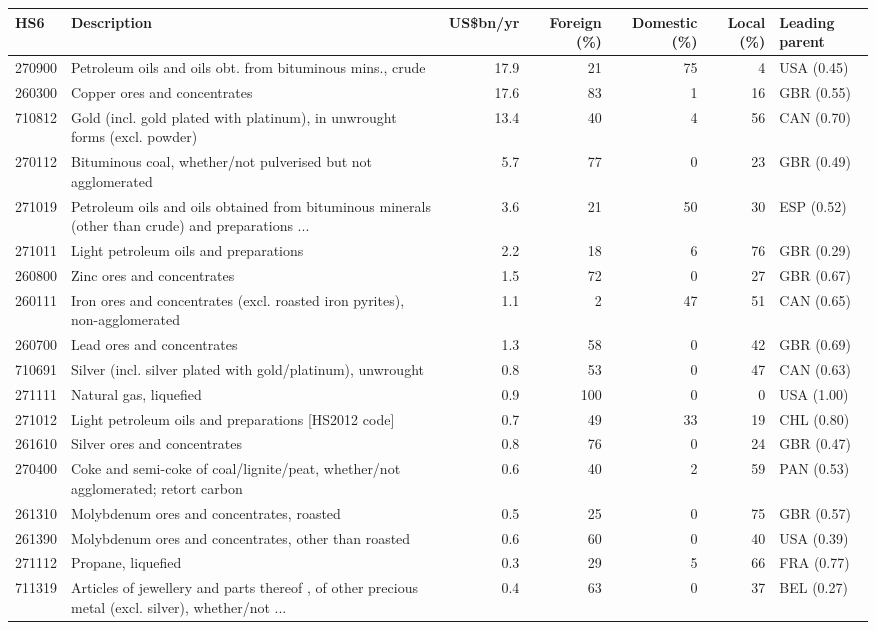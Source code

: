 \begin{tabular}{@{}l p{6.4cm} r r r r l@{}}
\toprule
HS6 & Description & US\$bn/yr & Foreign (\%) & Domestic (\%) & Local (\%) & Leading parent \\
\midrule
270900 & Petroleum oils and oils obt. from bituminous mins., crude & 17.9 & 21 & 75 & 4 & USA (0.45) \\
260300 & Copper ores and concentrates & 17.6 & 83 & 1 & 16 & GBR (0.55) \\
710812 & Gold (incl. gold plated with platinum), in unwrought forms (excl. powder) & 13.4 & 40 & 4 & 56 & CAN (0.70) \\
270112 & Bituminous coal, whether/\allowbreak{}not pulverised but not agglomerated & 5.7 & 77 & 0 & 23 & GBR (0.49) \\
271019 & Petroleum oils and oils obtained from bituminous minerals (other than crude) and preparations ... & 3.6 & 21 & 50 & 30 & ESP (0.52) \\
271011 & Light petroleum oils and preparations & 2.2 & 18 & 6 & 76 & GBR (0.29) \\
260800 & Zinc ores and concentrates & 1.5 & 72 & 0 & 27 & GBR (0.67) \\
260111 & Iron ores and concentrates (excl. roasted iron pyrites), non-agglomerated & 1.1 & 2 & 47 & 51 & CAN (0.65) \\
260700 & Lead ores and concentrates & 1.3 & 58 & 0 & 42 & GBR (0.69) \\
710691 & Silver (incl. silver plated with gold/\allowbreak{}platinum), unwrought & 0.8 & 53 & 0 & 47 & CAN (0.63) \\
271111 & Natural gas, liquefied & 0.9 & 100 & 0 & 0 & USA (1.00) \\
271012 & Light petroleum oils and preparations [HS2012 code] & 0.7 & 49 & 33 & 19 & CHL (0.80) \\
261610 & Silver ores and concentrates & 0.8 & 76 & 0 & 24 & GBR (0.47) \\
270400 & Coke and semi-coke of coal/\allowbreak{}lignite/\allowbreak{}peat, whether/\allowbreak{}not agglomerated; retort carbon & 0.6 & 40 & 2 & 59 & PAN (0.53) \\
261310 & Molybdenum ores and concentrates, roasted & 0.5 & 25 & 0 & 75 & GBR (0.57) \\
261390 & Molybdenum ores and concentrates, other than roasted & 0.6 & 60 & 0 & 40 & USA (0.39) \\
271112 & Propane, liquefied & 0.3 & 29 & 5 & 66 & FRA (0.77) \\
711319 & Articles of jewellery and parts thereof , of other precious metal (excl. silver), whether/\allowbreak{}not ... & 0.4 & 63 & 0 & 37 & BEL (0.27) \\

\end{tabular}
